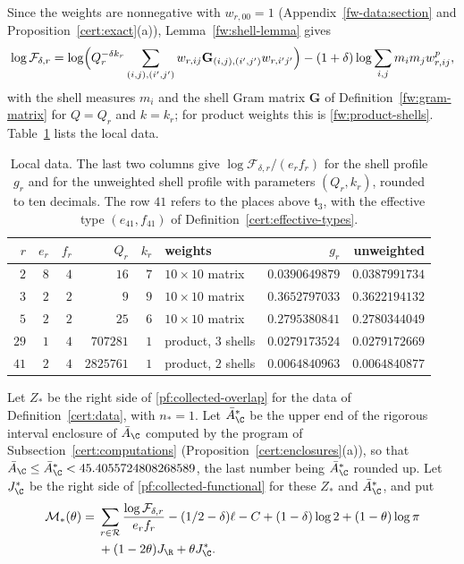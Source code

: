 Since the weights are nonnegative with $w_{r,00}=1$ (Appendix~\ref{fw-data:section}
and Proposition~\ref{cert:exact}(a)), Lemma~\ref{fw:shell-lemma} gives
\begin{equation}\label{cert:finite-factor}
 \log\mathcal F_{\delta,r}
 =\log\Bigl(Q_r^{-\delta k_r}\sum_{(i,j),(i',j')}w_{r,ij}\mathbf G_{(i,j),(i',j')}w_{r,i'j'}\Bigr)
 -(1+\delta)\log\sum_{i,j}m_im_jw_{r,ij}^p,
\end{equation}
with the shell measures $m_i$ and the shell Gram matrix $\mathbf G$ of
Definition~\ref{fw:gram-matrix} for $Q=Q_r$ and $k=k_r$; for product weights this is
\eqref{fw:product-shells}. Table~\ref{cert:tab-local} lists the local data.

\begin{table}[htbp]
\centering\small
\caption{Local data. The last two columns give
$\log\mathcal F_{\delta,r}/(e_rf_r)$ for the shell profile $g_r$ and for
the unweighted shell profile with parameters $(Q_r,k_r)$, rounded to ten
decimals. The row $41$ refers to the places above $\mathfrak t_3$, with the
effective type $(e_{41},f_{41})$ of Definition~\ref{cert:effective-types}.}
\label{cert:tab-local}
\begin{tabular}{rrrrrlrr}
\toprule
$r$ & $e_r$ & $f_r$ & $Q_r$ & $k_r$ & weights & $g_r$ & unweighted\\
\midrule
$2$ & $8$ & $4$ & $16$ & $7$ & $10\times10$ matrix & $0.0390649879$ & $0.0387991734$\\
$3$ & $2$ & $2$ & $9$ & $9$ & $10\times10$ matrix & $0.3652797033$ & $0.3622194132$\\
$5$ & $2$ & $2$ & $25$ & $6$ & $10\times10$ matrix & $0.2795380841$ & $0.2780344049$\\
$29$ & $1$ & $4$ & $707281$ & $1$ & product, $3$ shells & $0.0279173524$ & $0.0279172669$\\
$41$ & $2$ & $4$ & $2825761$ & $1$ & product, $2$ shells & $0.0064840963$ & $0.0064840877$\\
\bottomrule
\end{tabular}
\end{table}

\begin{definition}\label{cert:lower-bounds}
Let $Z_*$ be the right side of \eqref{pf:collected-overlap} for the data
of Definition~\ref{cert:data}, with $n_*=1$. Let $\bar A_\C^*$ be the
upper end of the rigorous interval enclosure of $\bar A_\C$ computed by
the program of Subsection~\ref{cert:computations}
(Proposition~\ref{cert:enclosures}(a)), so that
$\bar A_\C\le\bar A_\C^*<45.4055724808268589$, the last number being
$\bar A_\C^*$ rounded up. Let $J_\C^*$ be the right side of
\eqref{pf:collected-functional} for these $Z_*$ and $\bar A_\C^*$, and put
\[
 \begin{split}
 \mathcal M_*(\theta)={}&\sum_{r\in\mathcal R}
 \frac{\log\mathcal F_{\delta,r}}{e_rf_r}
 -(1/2-\delta)\ell-C+(1-\delta)\log2+(1-\theta)\log\pi\\
 &+(1-2\theta)J_\R+\theta J_\C^* .
 \end{split}
\]
\end{definition}

